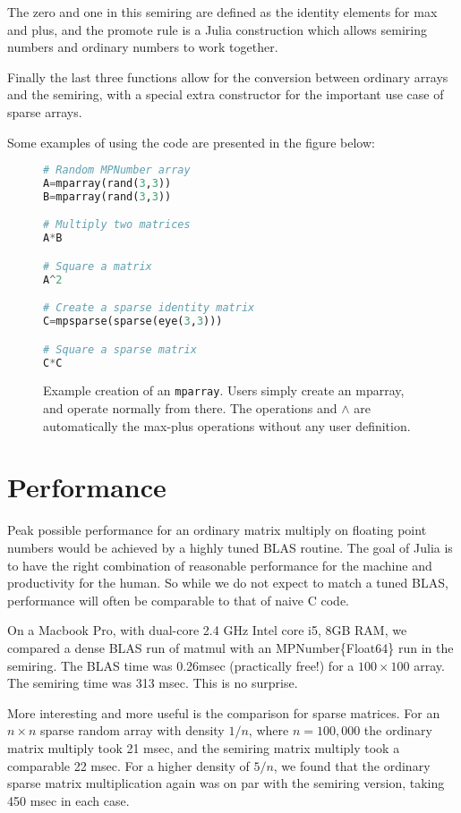 \documentclass[conference]{IEEEtran}
\begin{document}
The zero and one in this semiring are defined as the identity elements for max and plus,
and the promote rule is a Julia construction which allows semiring numbers and ordinary
numbers to work together.

Finally the last three functions allow for the conversion between ordinary arrays and the semiring, with a special extra constructor for the important use case of sparse arrays.

Some examples of using the code are presented in the figure below:

\begin{figure}[h]
\begin{lstlisting}[language=python, frame=single]
# Random MPNumber array
A=mparray(rand(3,3)) 
B=mparray(rand(3,3))

# Multiply two matrices
A*B

# Square a matrix
A^2

# Create a sparse identity matrix
C=mpsparse(sparse(eye(3,3)))

# Square a sparse matrix
C*C
\end{lstlisting}
\label{fig:example}
\caption{Example creation of an {\tt mparray}.
Users simply create an mparray, and operate normally from there.
The operations {\tt *} and $\wedge$  are automatically the max-plus operations without any user definition.}
\end{figure}

\section{Performance}

Peak possible performance for an ordinary matrix multiply on floating point numbers
would be achieved by a highly tuned BLAS routine.
The goal of Julia is to have the right combination of reasonable performance
for the machine and productivity for the human.  So while we do not expect to match
a tuned BLAS, performance will often be comparable to that of naive C code.

On a Macbook Pro, with dual-core 2.4 GHz Intel core i5, 8GB RAM, we compared a dense BLAS run of matmul with an MPNumber\{Float64\} run in the semiring.
The BLAS time was 0.26msec (practically free!) for a $100 \times 100$ array.  The semiring time
was 313 msec.  This is no surprise.

More interesting and more useful is the comparison for sparse
matrices.  For an $n \times n$ sparse random array with density $1/n$,
where $n = 100,000$ the ordinary matrix multiply took 21 msec, and the
semiring matrix multiply took a comparable 22 msec. For a higher
density of $5/n$, we found that the ordinary sparse matrix
multiplication again was on par with the semiring version, taking 450
msec in each case.
\end{document}
